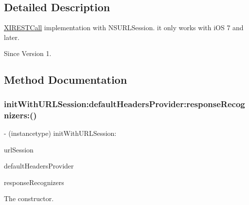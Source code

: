 \subsection{Detailed Description}
\hyperlink{class_x_i_r_e_s_t_call-p}{X\+I\+R\+E\+S\+T\+Call} implementation with N\+S\+U\+R\+L\+Session. it only works with i\+OS 7 and later. 

\begin{DoxySince}{Since}
Version 1. 
\end{DoxySince}


\subsection{Method Documentation}
\hypertarget{interface_x_i_simple_r_e_s_t_call_ab6b30d86ec930f88b747d702cc1190a5}{}\label{interface_x_i_simple_r_e_s_t_call_ab6b30d86ec930f88b747d702cc1190a5} 
\subsubsection{\texorpdfstring{init\+With\+U\+R\+L\+Session\+:default\+Headers\+Provider\+:response\+Recognizers\+:()}{initWithURLSession:defaultHeadersProvider:responseRecognizers:()}}
{\footnotesize\ttfamily -\/ (instancetype) init\+With\+U\+R\+L\+Session\+: \begin{DoxyParamCaption}\item[{(N\+S\+U\+R\+L\+Session $\ast$)}]{url\+Session }\item[{defaultHeadersProvider:(\hyperlink{interface_x_i_r_e_s_t_default_headers_provider}{X\+I\+R\+E\+S\+T\+Default\+Headers\+Provider} $\ast$)}]{default\+Headers\+Provider }\item[{responseRecognizers:(N\+S\+Array $\ast$)}]{response\+Recognizers }\end{DoxyParamCaption}}



The constructor. 


